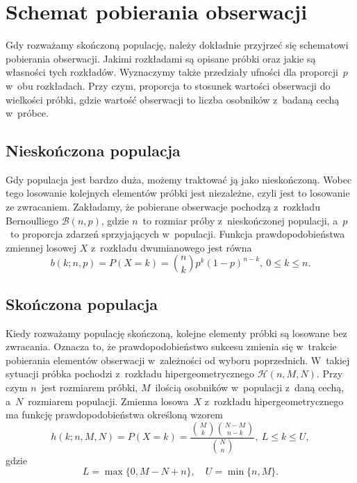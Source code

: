 \chapter{Schemat pobierania obserwacji}
\label{r1}
Gdy rozważamy skończoną populację, należy dokładnie przyjrzeć się schematowi pobierania obserwacji. Jakimi rozkładami są opisane próbki oraz jakie są własności tych rozkładów. Wyznaczymy także przedziały ufności dla proporcji~$p$ w~obu rozkładach. Przy czym, proporcja to stosunek wartości obserwacji do wielkości próbki, gdzie wartość obserwacji to liczba osobników z~badaną cechą w~próbce.


\section{Nieskończona populacja}
Gdy populacja jest bardzo duża, możemy traktować ją jako nieskończoną. Wobec tego losowanie kolejnych elementów próbki jest niezależne, czyli jest to losowanie ze zwracaniem. Zakładamy, że pobierane obserwacje pochodzą z~rozkładu Bernoulliego $\mathcal{B}(n,p)$, gdzie $n$~to rozmiar próby z~nieskończonej populacji, a~$p$~to proporcja zdarzeń sprzyjających w~populacji. Funkcja prawdopodobieństwa zmiennej losowej $X$ z~rozkładu dwumianowego jest równa
\begin{equation}
b(k;n,p) = P(X=k) = \binom{n}{k} p^k (1-p)^{n-k},\ 0\leq k\leq n.
\end{equation}

\section{Skończona populacja}
\label{r1:skonczonapopulacja}
Kiedy rozważamy populację skończoną, kolejne elementy próbki są losowane bez zwracania. Oznacza to, że prawdopodobieństwo sukcesu zmienia się w~trakcie pobierania elementów obserwacji w~zależności od wyboru poprzednich. W~takiej sytuacji próbka pochodzi z~rozkładu hipergeometrycznego $\mathcal{H}(n,M,N)$. Przy czym $n$~jest rozmiarem próbki, $M$~ilością osobników w~populacji z~daną cechą, a~$N$~rozmiarem populacji. Zmienna losowa~$X$ z~rozkładu hipergeometrycznego ma funkcję prawdopodobieństwa określoną wzorem
\begin{equation}
\label{hg}
h(k;n,M,N) = P(X=k) = \frac{\binom{M}{k} \binom{N-M}{n-k}}{\binom{N}{n}},\ L\leq k\leq U,
\end{equation}
gdzie
\begin{equation}
\label{ograniczenia}
L=\max\{0,M-N+n\},\quad U=\min\{n,M\}.
\end{equation}

